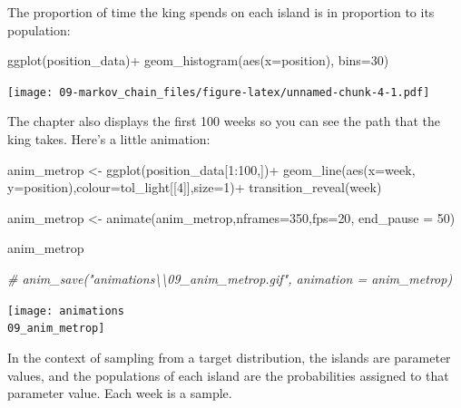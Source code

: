 \documentclass[
]{book}
\newenvironment{Shaded}{\begin{snugshade}}{\end{snugshade}}
\newcommand{\AttributeTok}[1]{\textcolor[rgb]{0.77,0.63,0.00}{#1}}
\newcommand{\CommentTok}[1]{\textcolor[rgb]{0.56,0.35,0.01}{\textit{#1}}}
\newcommand{\DecValTok}[1]{\textcolor[rgb]{0.00,0.00,0.81}{#1}}
\newcommand{\FunctionTok}[1]{\textcolor[rgb]{0.00,0.00,0.00}{#1}}
\newcommand{\NormalTok}[1]{#1}
\newcommand{\OtherTok}[1]{\textcolor[rgb]{0.56,0.35,0.01}{#1}}
\newcommand{\SpecialCharTok}[1]{\textcolor[rgb]{0.00,0.00,0.00}{#1}}
\begin{document}
The proportion of time the king spends on each island is in proportion to its population:

\begin{Shaded}
\begin{Highlighting}[]
\FunctionTok{ggplot}\NormalTok{(position\_data)}\SpecialCharTok{+}
  \FunctionTok{geom\_histogram}\NormalTok{(}\FunctionTok{aes}\NormalTok{(}\AttributeTok{x=}\NormalTok{position), }\AttributeTok{bins=}\DecValTok{30}\NormalTok{)}
\end{Highlighting}
\end{Shaded}

\texttt{[image: 09-markov\_chain\_files/figure-latex/unnamed-chunk-4-1.pdf]}

The chapter also displays the first 100 weeks so you can see the path that the king takes. Here's a little animation:

\begin{Shaded}
\begin{Highlighting}[]
\NormalTok{anim\_metrop }\OtherTok{\textless{}{-}} \FunctionTok{ggplot}\NormalTok{(position\_data[}\DecValTok{1}\SpecialCharTok{:}\DecValTok{100}\NormalTok{,])}\SpecialCharTok{+}
  \FunctionTok{geom\_line}\NormalTok{(}\FunctionTok{aes}\NormalTok{(}\AttributeTok{x=}\NormalTok{week, }\AttributeTok{y=}\NormalTok{position),}\AttributeTok{colour=}\NormalTok{tol\_light[[}\DecValTok{4}\NormalTok{]],}\AttributeTok{size=}\DecValTok{1}\NormalTok{)}\SpecialCharTok{+}
  \FunctionTok{transition\_reveal}\NormalTok{(week)}
                    
\NormalTok{anim\_metrop }\OtherTok{\textless{}{-}} \FunctionTok{animate}\NormalTok{(anim\_metrop,}\AttributeTok{nframes=}\DecValTok{350}\NormalTok{,}\AttributeTok{fps=}\DecValTok{20}\NormalTok{, }\AttributeTok{end\_pause =} \DecValTok{50}\NormalTok{)}

\NormalTok{anim\_metrop}

\CommentTok{\# anim\_save("animations\textbackslash{}\textbackslash{}09\_anim\_metrop.gif", animation = anim\_metrop)}
\end{Highlighting}
\end{Shaded}

\texttt{[image: animations\\09\_anim\_metrop]}

In the context of sampling from a target distribution, the islands are parameter values, and the populations of each island are the probabilities assigned to that parameter value. Each week is a sample.
\end{document}
